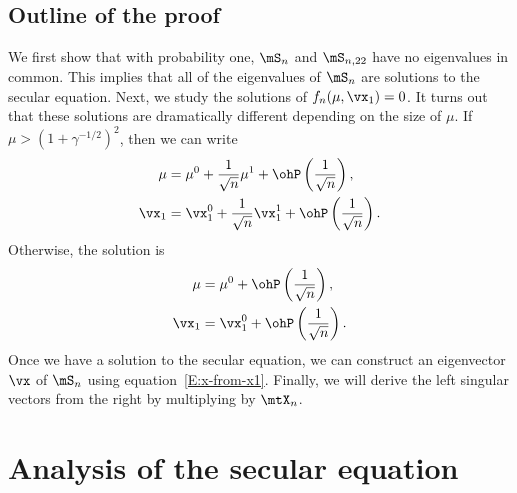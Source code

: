 \subsection{Outline of the proof}

We first show that with probability one, $\mS_n$ and $\mS_{n,22}$ have no eigenvalues in common.  This implies that all of the eigenvalues of $\mS_n$ are solutions to the secular equation.  Next, we study the solutions of 
$f_n(\mu, \vx_1) = 0$.  It turns out that these solutions are dramatically different depending on the size of $\mu$.  If $\mu > (1 + \gamma^{-1/2})^2$,
then we can write
\begin{align*}
    \mu 
        &= 
            \mu^0 
            + 
            \frac{1}{\sqrt{n}}
            \mu^1 
            + 
            \ohP\left( \frac{1}{\sqrt{n}} \right), \\
    \vx_1
        &=
            \vx_1^0
            +
            \frac{1}{\sqrt{n}}
            \vx_1^1
            + 
            \ohP\left( \frac{1}{\sqrt{n}} \right).
\end{align*}
Otherwise, the solution is
\begin{align*}
    \mu
        &=
            \mu^0
            + 
            \ohP\left( \frac{1}{\sqrt{n}} \right), \\
    \vx_1
        &=
            \vx_1^0
            +
            \ohP\left( \frac{1}{\sqrt{n}} \right).
\end{align*}
Once we have a solution to the secular equation, we can construct an
eigenvector $\vx$ of $\mS_n$ using equation~\eqref{E:x-from-x1}.  Finally, we will derive the left singular vectors from the right by multiplying by $\mtX_n$.

\section{Analysis of the secular equation}

